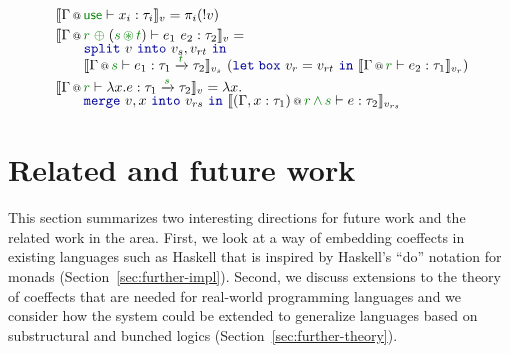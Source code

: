 \begin{figure}[t]
\begin{equation*}
\begin{array}{l}
 \sem{ \coctx{\Gamma}{\cunit}\vdash x_i : \tau_i }_v = \pi_i (!v) \\[0.25em]
 \sem{ \coctx{\Gamma}{\cclrd{r}\;\cpar\;(\cclrd{s}\,\cseq\,\cclrd{t})} \vdash e_1~e_2 : \tau_2 }_v =\\[-0.25em]
   \qquad \kvd{split}~v~\kvd{into}~v_s, v_{rt}~\kvd{in} \\[-0.25em]
   \qquad \sem{ \coctx{\Gamma}{\cclrd{s}} \vdash e_1 : \tau_1 \xrightarrow{\cclrd{t}} \tau_2 }_{v_s}
      ~(\kvd{let\;box}~v_r = v_{rt}~\kvd{in}~\sem{ \coctx{\Gamma}{\cclrd{r}} \vdash e_2 : \tau_1}_{v_r}) \\[0.25em]
 \sem{ \coctx{\Gamma}{\cclrd{r}} \vdash \lambda x.e:\tau_1 \xrightarrow{\cclrd{s}} \tau_2 }_v = \lambda x. \\[-0.25em]
   \qquad \kvd{merge}~v,x~\kvd{into}~v_{rs}~\kvd{in}~\sem{ \coctx{(\Gamma,x:\tau_1)}{\cclrd{r}\,\czip\,\cclrd{s}} \vdash e : \tau_2 }_{v_{rs}}
\end{array}
\end{equation*}
\label{fig:conclusions-embed}
\end{figure}


%
%

\section{Related and future work}
\label{sec:further-further}

This section summarizes two interesting directions for future work and the related
work in the area. First, we look at a way of embedding coeffects in existing languages
such as Haskell that is inspired by Haskell's ``do'' notation for monads
(Section~\ref{sec:further-impl}). Second, we discuss extensions to the theory of coeffects that
are needed for real-world programming languages and we consider how the system could be extended
to generalize languages based on substructural and bunched logics (Section~\ref{sec:further-theory}).

